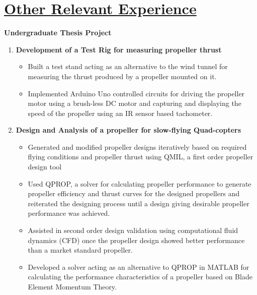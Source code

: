 \section{\underline{Other Relevant Experience}}
\large{\textbf{Undergraduate Thesis Project}}
\hspace{3in}
\majordate
\begin{enumerate}
\item\large{\textbf{Development of a Test Rig for measuring propeller thrust}}
\begin{itemize}
\item \large{Built a test stand acting as an alternative to the wind tunnel for measuring the thrust produced by a propeller mounted on it.}
\item\large{Implemented Arduino Uno controlled circuits for driving the propeller motor using a brush-less DC motor and capturing and displaying the speed of the propeller using an IR sensor based tachometer.}
\end{itemize}



\item\large{\textbf{Design and Analysis of a propeller for slow-flying Quad-copters}}
\begin{itemize}
\item\large{Generated and modified propeller designs iteratively based on required flying conditions and propeller thrust using QMIL, a first order propeller design tool}
\item\large{Used QPROP, a solver for calculating propeller performance to generate propeller efficiency and thrust curves for the designed propellers and reiterated the designing process until a design giving desirable propeller performance was achieved.}
\item\large{Assisted in second order design validation using computational fluid dynamics (CFD) once the propeller design showed better performance than a market standard propeller.}
\item\large{Developed a solver acting as an alternative to QPROP in MATLAB for calculating the performance characteristics of a propeller based on Blade Element Momentum Theory.}
\end{itemize}
\end{enumerate}
